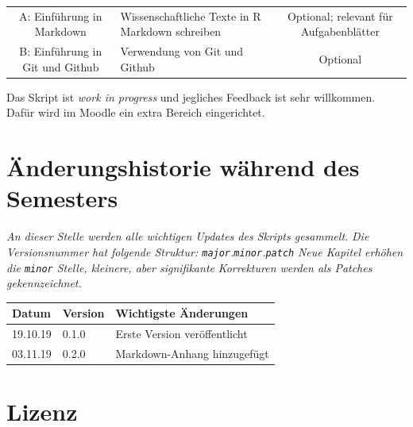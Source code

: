 \documentclass[]{tufte-book}
\begin{document}
\begin{longtable}[]{@{}clc@{}}
\begin{minipage}[t]{0.24\columnwidth}
A: Einführung in Markdown\strut
\end{minipage} & \begin{minipage}[t]{0.34\columnwidth}\raggedright\strut
Wissenschaftliche Texte in R Markdown schreiben\strut
\end{minipage} & \begin{minipage}[t]{0.34\columnwidth}\centering\strut
Optional; relevant für Aufgabenblätter\strut
\end{minipage}\tabularnewline
\begin{minipage}[t]{0.24\columnwidth}\centering\strut
B: Einführung in Git und Github\strut
\end{minipage} & \begin{minipage}[t]{0.34\columnwidth}\raggedright\strut
Verwendung von Git und Github\strut
\end{minipage} & \begin{minipage}[t]{0.34\columnwidth}\centering\strut
Optional\strut
\end{minipage}\tabularnewline
\bottomrule
\end{longtable}

Das Skript ist \emph{work in progress} und jegliches Feedback ist sehr
willkommen. Dafür wird im Moodle ein extra Bereich eingerichtet.

\section*{Änderungshistorie während des
Semesters}\label{anderungshistorie-wahrend-des-semesters}

\emph{An dieser Stelle werden alle wichtigen Updates des Skripts
gesammelt.} \emph{Die Versionsnummer hat folgende Struktur:
\texttt{major}.\texttt{minor}.\texttt{patch}} \emph{Neue Kapitel erhöhen
die \texttt{minor} Stelle, kleinere, aber signifikante}
\emph{Korrekturen werden als Patches gekennzeichnet.}

\begin{longtable}[]{@{}lll@{}}
\toprule
Datum & Version & Wichtigste Änderungen\tabularnewline
\midrule
\endhead
19.10.19 & 0.1.0 & Erste Version veröffentlicht\tabularnewline
03.11.19 & 0.2.0 & Markdown-Anhang hinzugefügt\tabularnewline
\bottomrule
\end{longtable}

\section*{Lizenz}\label{lizenz}
\end{document}
